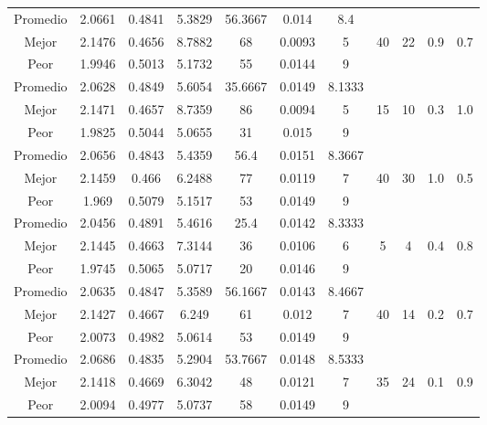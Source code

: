 \begin{table}[h!]
\begin{center}
\begin{tabular}{|c|c|c|c|c|c|c|c|c|c|c|}
        \hline
        \hline
            Promedio  & 2.0661 & 0.4841 & 5.3829 & 56.3667 & 0.014 & 8.4 &  &  &  & \\
            \cline{1-7}
            Mejor & 2.1476 & 0.4656  & 8.7882 & 68 & 0.0093 & 5 & 40 & 22 & 0.9 & 0.7\\
            \cline{1-7}
            Peor & 1.9946 & 0.5013  & 5.1732 & 55 & 0.0144 & 9 &  &  &  & \\
        \hline
        \hline
            Promedio  & 2.0628 & 0.4849 & 5.6054 & 35.6667 & 0.0149 & 8.1333 &  &  &  & \\
            \cline{1-7}
            Mejor & 2.1471 & 0.4657  & 8.7359 & 86 & 0.0094 & 5 & 15 & 10 & 0.3 & 1.0\\
            \cline{1-7}
            Peor & 1.9825 & 0.5044  & 5.0655 & 31 & 0.015 & 9 &  &  &  & \\
        \hline
        \hline
            Promedio  & 2.0656 & 0.4843 & 5.4359 & 56.4 & 0.0151 & 8.3667 &  &  &  & \\
            \cline{1-7}
            Mejor & 2.1459 & 0.466  & 6.2488 & 77 & 0.0119 & 7 & 40 & 30 & 1.0 & 0.5\\
            \cline{1-7}
            Peor & 1.969 & 0.5079  & 5.1517 & 53 & 0.0149 & 9 &  &  &  & \\
        \hline
        \hline
            Promedio  & 2.0456 & 0.4891 & 5.4616 & 25.4 & 0.0142 & 8.3333 &  &  &  & \\
            \cline{1-7}
            Mejor & 2.1445 & 0.4663  & 7.3144 & 36 & 0.0106 & 6 & 5 & 4 & 0.4 & 0.8\\
            \cline{1-7}
            Peor & 1.9745 & 0.5065  & 5.0717 & 20 & 0.0146 & 9 &  &  &  & \\
        \hline
        \hline
            Promedio  & 2.0635 & 0.4847 & 5.3589 & 56.1667 & 0.0143 & 8.4667 &  &  &  & \\
            \cline{1-7}
            Mejor & 2.1427 & 0.4667  & 6.249 & 61 & 0.012 & 7 & 40 & 14 & 0.2 & 0.7\\
            \cline{1-7}
            Peor & 2.0073 & 0.4982  & 5.0614 & 53 & 0.0149 & 9 &  &  &  & \\
        \hline
        \hline
            Promedio  & 2.0686 & 0.4835 & 5.2904 & 53.7667 & 0.0148 & 8.5333 &  &  &  & \\
            \cline{1-7}
            Mejor & 2.1418 & 0.4669  & 6.3042 & 48 & 0.0121 & 7 & 35 & 24 & 0.1 & 0.9\\
            \cline{1-7}
            Peor & 2.0094 & 0.4977  & 5.0737 & 58 & 0.0149 & 9 &  &  &  & \\

\end{tabular}
\end{center}
\end{table}
